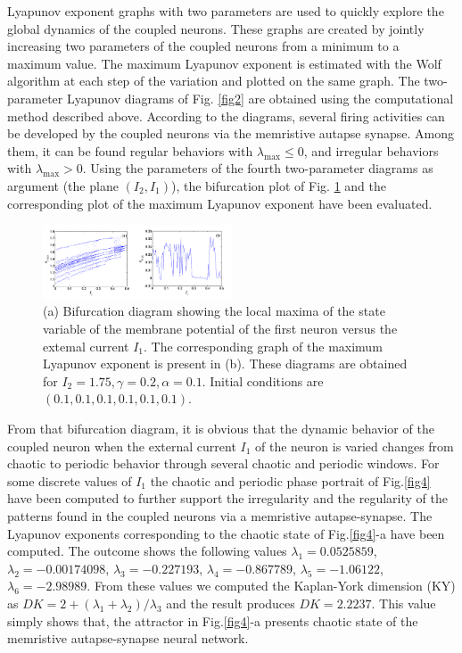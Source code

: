 \documentclass[journal]{IEEEtran/IEEEtran}
\begin{document}
Lyapunov exponent graphs with two parameters are used to quickly explore the global dynamics of the coupled neurons. These graphs are created by jointly increasing two parameters of the coupled neurons from a minimum to a maximum value. The maximum Lyapunov exponent is estimated with the Wolf algorithm \cite{njitacke2022hamilton} at each step of the variation and plotted on the same graph. The two-parameter Lyapunov diagrams of Fig. \ref{fig2} are obtained using the computational method described above. According to the diagrams, several firing activities can be developed by the coupled neurons via the memristive autapse synapse. Among them, it can be found regular behaviors with  ${\lambda _{\max }} \le 0$, and irregular behaviors with  ${\lambda _{\max }} > 0$.  Using the parameters of the fourth two-parameter diagrams as argument (the plane  $\left( {{I_2},{I_1}} \right)$), the bifurcation plot of Fig. \ref{fig3} and the corresponding plot of the maximum Lyapunov exponent have been evaluated.

\begin{figure}[!t]
	\centering
	\includegraphics[width=0.5\textwidth]{fig3.png}
		\caption{(a) Bifurcation diagram showing the local maxima of the state variable of the membrane potential of the first neuron versus the extemal current $I_{1}$. The corresponding graph of the maximum Lyapunov exponent is present in (b). These diagrams are obtained for $I_{2}=1.75, \gamma=0.2, \alpha=0.1$. Initial conditions are $(0.1,0.1,0.1,0.1,0.1,0.1)$.}
	\label{fig3}
\end{figure}

From that bifurcation diagram, it is obvious that the dynamic behavior of the coupled neuron when the external current ${I_1}$  of the neuron is varied changes from chaotic to periodic behavior through several chaotic and periodic windows. For some discrete values of ${I_1}$  the chaotic and periodic phase portrait of Fig.\ref{fig4} have been computed to further support the  irregularity and the regularity of the patterns found in the coupled neurons via a memristive autapse-synapse. The Lyapunov exponents corresponding to the chaotic state of Fig.\ref{fig4}-a have been computed. The outcome shows the following values ${\lambda _1} = 0.0525859$, ${\lambda _2} =  - 0.00174098$, ${\lambda _3} =  - 0.227193$, ${\lambda _4} =  - 0.867789$, ${\lambda _5} =  - 1.06122$, ${\lambda _6} =  - 2.98989$. From these values we computed the Kaplan-York dimension (KY) as $DK = 2 + ({\lambda _1} + {\lambda _2})/{\lambda _3}$ and the result produces $DK=2.2237$. This value simply shows that, the attractor in Fig.\ref{fig4}-a presents chaotic state of the memristive autapse-synapse neural network.
\end{document}
